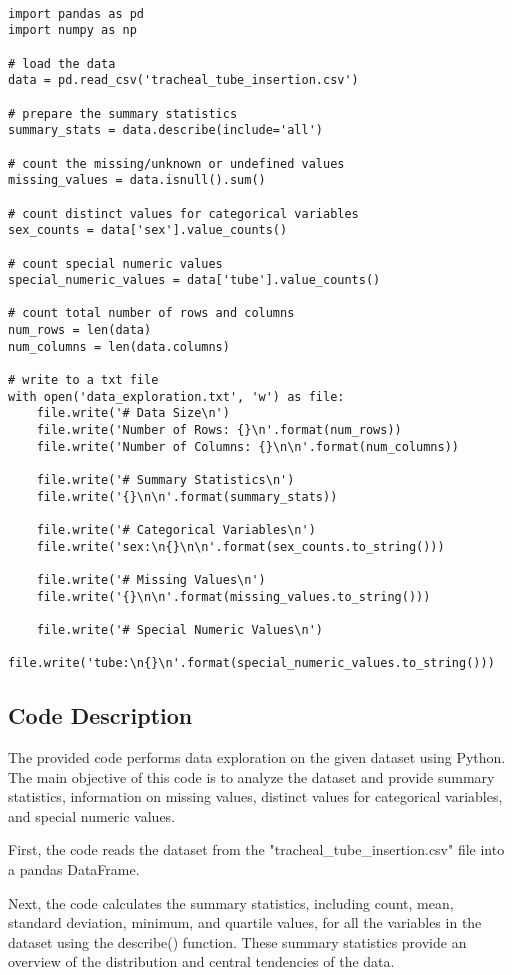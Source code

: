 \documentclass[11pt]{article}
\begin{document}
\begin{verbatim}

import pandas as pd
import numpy as np

# load the data
data = pd.read_csv('tracheal_tube_insertion.csv')

# prepare the summary statistics
summary_stats = data.describe(include='all')

# count the missing/unknown or undefined values
missing_values = data.isnull().sum()

# count distinct values for categorical variables
sex_counts = data['sex'].value_counts()

# count special numeric values
special_numeric_values = data['tube'].value_counts()

# count total number of rows and columns
num_rows = len(data)
num_columns = len(data.columns)

# write to a txt file
with open('data_exploration.txt', 'w') as file:
    file.write('# Data Size\n')
    file.write('Number of Rows: {}\n'.format(num_rows))
    file.write('Number of Columns: {}\n\n'.format(num_columns))

    file.write('# Summary Statistics\n')
    file.write('{}\n\n'.format(summary_stats))

    file.write('# Categorical Variables\n')
    file.write('sex:\n{}\n\n'.format(sex_counts.to_string()))

    file.write('# Missing Values\n')
    file.write('{}\n\n'.format(missing_values.to_string()))

    file.write('# Special Numeric Values\n')
    file.write('tube:\n{}\n'.format(special_numeric_values.to_string()))

\end{verbatim}

\subsection{Code Description}

The provided code performs data exploration on the given dataset using Python. The main objective of this code is to analyze the dataset and provide summary statistics, information on missing values, distinct values for categorical variables, and special numeric values.

First, the code reads the dataset from the "tracheal\_tube\_insertion.csv" file into a pandas DataFrame. 

Next, the code calculates the summary statistics, including count, mean, standard deviation, minimum, and quartile values, for all the variables in the dataset using the describe() function. These summary statistics provide an overview of the distribution and central tendencies of the data.
\end{document}

